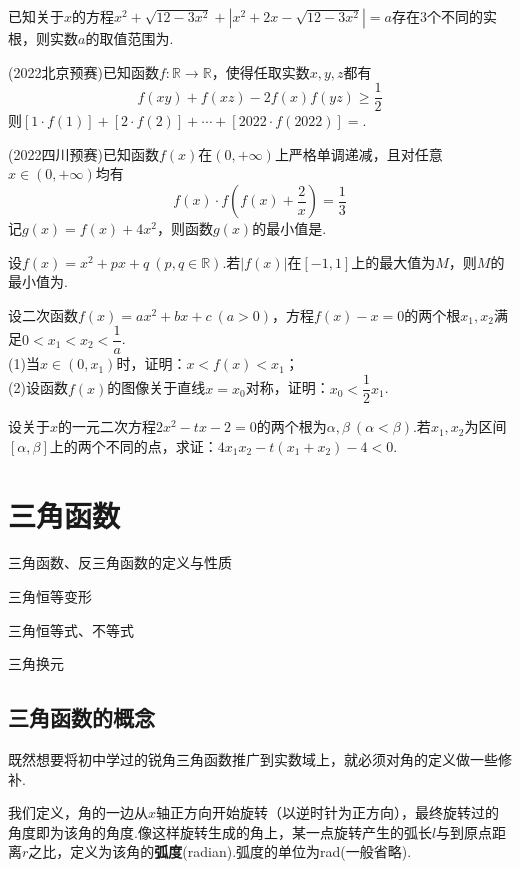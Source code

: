 \documentclass[lang=cn, zihao=5]{elegantbook}
\newcommand{\ssb}[1]{\left( #1 \right)}
\newcommand{\R}{\mathbb{R}}
\newcommand{\tk}{\uline{\hspace{4em}}}
\begin{document}
\newpage
\begin{problemset}
	\item 已知关于$x$的方程$x^2+\sqrt{12-3x^2} + |x^2 + 2x - \sqrt{12-3x^2} |=a$存在$3$个不同的实根，则实数$a$的取值范围为\tk .
	\item (2022北京预赛)已知函数$f:\R \to \R$，使得任取实数$x,y,z$都有$$f(xy)+f(xz)-2f(x)f(yz) \geq \frac{1}{2}$$
	则$[1 \cdot f(1)] + [2 \cdot f(2)] + \cdots + [2022 \cdot f(2022)]=$\tk .
	\item (2022四川预赛)已知函数$f(x)$在$(0,+\infty)$上严格单调递减，且对任意$x \in (0,+\infty)$均有$$f(x) \cdot f\ssb{f(x)+\frac{2}{x}} = \frac{1}{3}$$记$g(x)=f(x)+4x^2$，则函数$g(x)$的最小值是\tk .
	\item 设$f(x)=x^2+px+q~(p,q \in \mathbb{R})$.若$|f(x)|$在$[-1,1]$上的最大值为$M$，则$M$的最小值为\tk .
	\item 设二次函数$f(x)=ax^2+bx+c~(a>0)$，方程$f(x)-x=0$的两个根$x_1,x_2$满足$0<x_1<x_2< \dfrac{1}{a}$. \\
	(1)当$x \in (0,x_1)$时，证明：$x<f(x)<x_1$； \\
	(2)设函数$f(x)$的图像关于直线$x=x_0$对称，证明：$x_0 < \dfrac{1}{2}x_1$.
	\item 设关于$x$的一元二次方程$2x^2-tx-2=0$的两个根为$\alpha , \beta ~ (\alpha < \beta)$.若$x_1,x_2$为区间$[\alpha ,\beta]$上的两个不同的点，求证：$4x_1x_2-t(x_1+x_2)-4<0$.
\end{problemset}


\chapter{三角函数}

\begin{introduction}
	\item 三角函数、反三角函数的定义与性质
	\item 三角恒等变形
	\item 三角恒等式、不等式
	\item 三角换元
\end{introduction}

\section{三角函数的概念}

既然想要将初中学过的锐角三角函数推广到实数域上，就必须对角的定义做一些修补.

我们定义，角的一边从$x$轴正方向开始旋转（以逆时针为正方向），最终旋转过的角度即为该角的角度.像这样旋转生成的角上，某一点旋转产生的弧长$l$与到原点距离$r$之比，定义为该角的\textbf{弧度}(radian).弧度的单位为rad(一般省略).
\end{document}
